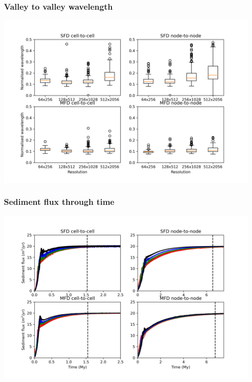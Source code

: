 \documentclass[aspectratio=169]{beamer}
\begin{document}
\begin{frame}
    \frametitle{Valley to valley wavelength}
    \centering
    \includegraphics[height=0.9\paperheight]{./figures/wavelength.png}
\end{frame}

\begin{frame}
    \frametitle{Sediment flux through time}
    \centering
    \includegraphics[height=0.9\paperheight]{./figures/sediment-flux.png}
\end{frame}
\end{document}

